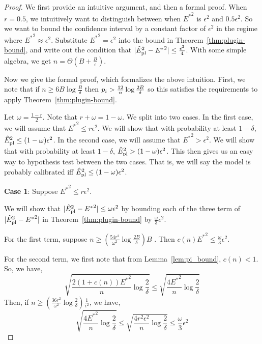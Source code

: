 \finalPlugin*

\begin{proof}
We first provide an intuitive argument, and then a formal proof. When $r = 0.5$, we intuitively want to distinguish between when ${E^*}^2$ is $\epsilon^2$ and $0.5\epsilon^2$. So we want to bound the confidence interval by a constant factor of $\epsilon^2$ in the regime where ${E^*}^2 \approx \epsilon^2$. Substitute ${E^*}^2 = \epsilon^2$ into the bound in Theorem~\ref{thm:plugin-bound}, and write out the condition that $| \hat{E}_{\textup{pl}}^2{} - {E^*}^2 | \leq \frac{\epsilon^2}{4}$. With some simple algebra, we get $n = \Theta(B + \frac{B}{\epsilon})$.

Now we give the formal proof, which formalizes the above intuition. First, we note that if $n \geq 6B \log{\frac{B}{\delta}}$ then $p_i > \frac{12}{n}\log{\frac{2B}{\delta}}{}$ so this satisfies the requirements to apply Theorem~\ref{thm:plugin-bound}.

Let $\omega = \frac{1-r}{2}$. Note that $r + \omega = 1 - \omega$. We split into two cases. In the first case, we will assume that ${E^*}^2 \leq r \epsilon^2$. We will show that with probability at least $1 - \delta$, $\hat{E}_{\textup{pl}}^2{} \leq (1-\omega) \epsilon^2$. In the second case, we will assume that ${E^*}^2 > \epsilon^2$. We will show that with probability at least $1 - \delta$, $\hat{E}_{\textup{pl}}^2{} > (1-\omega) \epsilon^2$. This then gives us an easy way to hypothesis test between the two cases. That is, we will say the model is probably calibrated iff $\hat{E}_{\textup{pl}}^2{} \leq (1-\omega) \epsilon^2$.

\textbf{Case 1}: Suppose  ${E^*}^2 \leq r \epsilon^2$.

We will show that $| \hat{E}_{\textup{pl}}^2{} - {E^*}^2 | \leq \omega \epsilon^2$ by bounding each of the three term of  $| \hat{E}_{\textup{pl}}^2{} - {E^*}^2 |$ in Theorem~\ref{thm:plugin-bound} by $\frac{\omega}{3}\epsilon^2$.

For the first term, suppose $n \geq (\frac{54r^2}{\omega^2}\log{\frac{2B}{\delta}})B$ . Then $c(n) {E^*}^2 \leq \frac{\omega}{3}\epsilon^2$.

For the second term, we first note that from Lemma~\ref{lem:pi_bound}, $c(n) < 1$. So, we have,
\[ \sqrt{\frac{2(1+c(n)){E^*}^2}{n} \log{\frac{2}{\delta}}} \leq \sqrt{\frac{4{E^*}^2}{n} \log{\frac{2}{\delta}}} \]
Then, if $n \geq (\frac{36r^2}{\omega^2} \log{\frac{2}{\delta}})\frac{1}{\epsilon^2}$, we have,
\[ \sqrt{\frac{4{E^*}^2}{n} \log{\frac{2}{\delta}}} \leq \sqrt{\frac{4r^2\epsilon^2}{n} \log{\frac{2}{\delta}}} \leq \frac{\omega}{3}\epsilon^2 \]


\end{proof}

